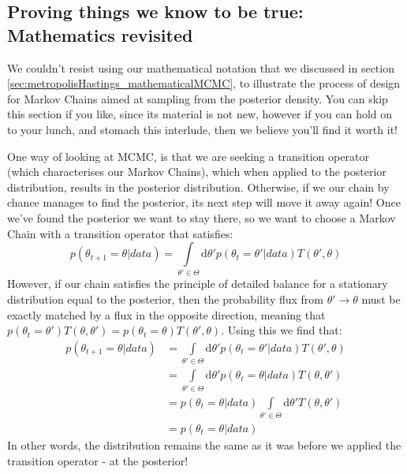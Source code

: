 \documentclass[11pt,fullpage]{book}
\begin{document}
\subsection{Proving things we know to be true: Mathematics revisited}
We couldn't resist using our mathematical notation that we discussed in section \ref{sec:metropolisHastings_mathematicalMCMC}, to illustrate the process of design for Markov Chains aimed at sampling from the posterior density. You can skip this section if you like, since its material is not new, however if you can hold on to your lunch, and stomach this interlude, then we believe you'll find it worth it!

One way of looking at MCMC, is that we are seeking a transition operator (which characterises our Markov Chains), which when applied to the posterior distribution, results in the posterior distribution\cite{chib1995understanding}. Otherwise, if we our chain by chance manages to find the posterior, its next step will move it away again! Once we've found the posterior we want to stay there, so we want to choose a Markov Chain with a transition operator that satisfies:
%
\begin{equation}
p(\theta_{t+1}=\theta|data)= \int\limits_{\theta'\in\Theta} \mathrm{d}\theta' p(\theta_t=\theta'|data) T(\theta',\theta)
\end{equation} 
%
However, if our chain satisfies the principle of detailed balance for a stationary distribution equal to the posterior, then the probability flux from $\theta'\rightarrow\theta$ must be exactly matched by a flux in the opposite direction, meaning that $p(\theta_t=\theta') T(\theta,\theta') = p(\theta_t=\theta) T(\theta',\theta)$. Using this we find that:
%
\begin{align}
p(\theta_{t+1}=\theta|data) &= \int\limits_{\theta'\in\Theta} \mathrm{d}\theta' p(\theta_t=\theta'|data) T(\theta',\theta)\\
&=\int\limits_{\theta'\in\Theta} \mathrm{d}\theta' p(\theta_t=\theta|data) T(\theta,\theta')\\
&=p(\theta_t=\theta|data) \int\limits_{\theta'\in\Theta} \mathrm{d}\theta' T(\theta,\theta')\\
&= p(\theta_t=\theta|data)
\end{align}
%
In other words, the distribution remains the same as it was before we applied the transition operator - at the posterior!
\end{document}
